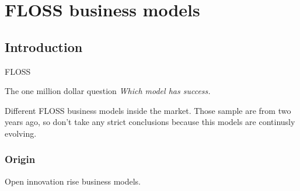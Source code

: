 \chapter{FLOSS business models}

\section{Introduction}\label{lesson-4-introduction}

FLOSS 

The one million dollar question \emph{Which model has success.}

Different FLOSS business models inside the market. Those sample are from two years ago, so don't take any strict conclusions because this models are continusly evolving.

\subsection{Origin}\label{lesson-4-origin}

Open innovation rise business models.


